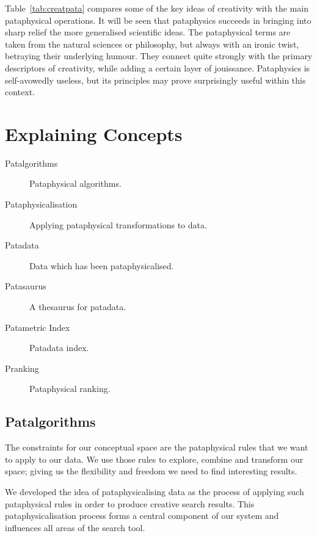 \begin{leftbar}
Table~\ref{tab:creatpata} compares some of the key ideas of creativity \autocite{Boden2003, Indurkhya, Koestler1964} with the main pataphysical operations. It will be seen that pataphysics succeeds in bringing into sharp relief the more generalised scientific ideas. The pataphysical terms are taken from the natural sciences or philosophy, but always with an ironic twist, betraying their underlying humour. They connect quite strongly with the primary descriptors of creativity, while adding a certain layer of jouissance. Pataphysics is self-avowedly useless, but its principles may prove surprisingly useful within this context.
\end{leftbar}


\section{Explaining Concepts}

\begin{description}
  \item [Patalgorithms] Pataphysical algorithms.
  \item [Pataphysicalisation] Applying pataphysical transformations to data.
  \item [Patadata] Data which has been pataphysicalised.
  \item [Patasaurus] A thesaurus for patadata.
  \item [Patametric Index] Patadata index.
  \item [Pranking] Pataphysical ranking.
\end{description}


\subsection*{Patalgorithms}

\begin{draft}
  The constraints for our conceptual space are the pataphysical rules that we want to apply to our data. We use those rules to explore, combine and transform our space; giving us the flexibility and freedom we need to find interesting results.

  We developed the idea of pataphysicalising data as the process of applying such pataphysical rules in order to produce creative search results. This pataphysicalisation process forms a central component of our system and influences all areas of the search tool.
\end{draft}

